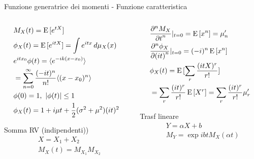 \documentclass[asd-beamer.tex]{subfiles}
\begin{document}
\begin{frame}{Funzione generatrice dei momenti - Funzione caratteristica}
\begin{columns}[T]
	\begin{column}{0.5\textwidth}
		\begin{align*}
		&M_X(t)=\E{[\exp{tX}]}\\
		&\phi_X(t)=\E{[\exp{itX}]}=\int\exp{itx}\,d\mu_X(x)\\
		&\exp{itx_0}\phi(t)=\exv{\exp{-ik(x-x_0)}}\\
		&=\sum_{n=0}^{\infty}\frac{(-it)^n}{n!}\exv{(x-x_0)^n}\\
		&\phi(0)=1,\ |\phi(t)|\leq1\\
		&\phi_X(t)=1+i\mu t+\frac{1}{2}(\sigma^2+\mu^2)(it)^2
		\end{align*}
		\begin{block}{Somma RV (indipendenti))}
			\begin{align*}
			&X=X_1+X_2\\
			&M_X(t)=M_{X_1}M_{X_2}
			\end{align*}
		\end{block}
	\end{column}
	\begin{column}{0.5\textwidth}
		\begin{align*}
		&\PDyn{t}{M_X}{n}|_{t=0}=\E{[x^n]}=\mu_n'\\
		&\PDyn{(it)}{\phi_X}{n}|_{t=0}=(-i)^n\E{[x^n]}\\
		&\phi_X(t)=\E{[\sum_r\frac{(itX)^r}{r!}]}\\
		&=\sum_r\frac{(it)^r}{r!}\E{[X^r]}=\sum_r\frac{(it)^r}{r!}\mu_r'
		\end{align*}
		\begin{block}{Trasf lineare}
			\begin{align*}
			&Y=\alpha X+b\\
			&M_Y=\exp{ibt}M_X(\alpha t)
			\end{align*}
		\end{block}
	\end{column}
\end{columns}
\end{frame}
\end{document}

